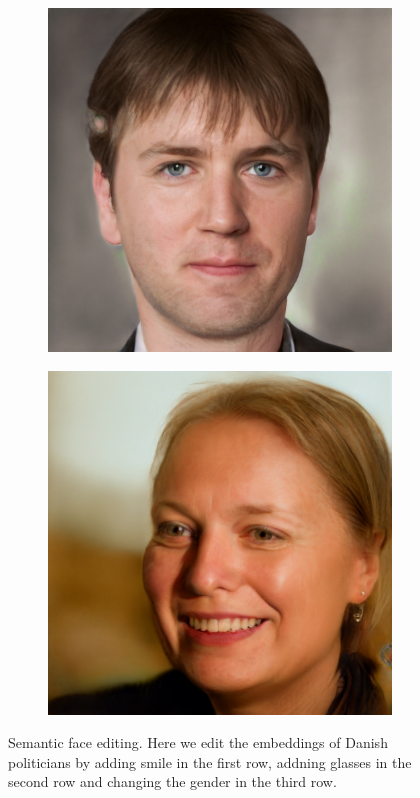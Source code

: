 \begin{figure}[h!]
\begin{subfigure}[b]{0.24\textwidth}
    \end{subfigure}
    \begin{subfigure}[b]{0.24\textwidth}
        \includegraphics[width=\textwidth]{fig/stylegan/faceedit/mette-gender}
    \end{subfigure}
    \begin{subfigure}[b]{0.24\textwidth}
        \includegraphics[width=\textwidth]{fig/stylegan/faceedit/uffe-gender}
    \end{subfigure}
    \caption{Semantic face editing. Here we edit the embeddings of Danish politicians by adding smile in the first row, addning glasses in the second row and changing the gender in the third row.}
    \label{faceedit}
\end{figure}
